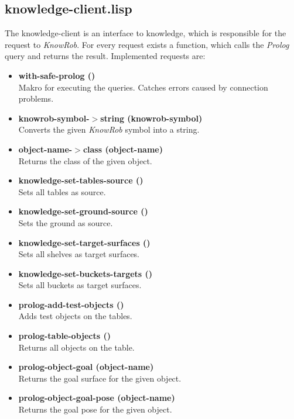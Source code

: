 \documentclass[main.tex]{subfiles}
\begin{document}
        \subsection{knowledge-client.lisp}
        The knowledge-client is an interface to knowledge, which is responsible for the request to \textit{KnowRob}. For every request exists a function, which calls the \textit{Prolog} query and returns the result. Implemented requests are:
            \begin{itemize}
            \label{knowledge-client}
              \item \textbf{with-safe-prolog ()} \\
              Makro for executing the queries. Catches errors caused by connection problems.
              \item \textbf{knowrob-symbol-$>$string (knowrob-symbol)} \\
              Converts the given \textit{KnowRob} symbol into a string.
              \item \textbf{object-name-$>$class (object-name)} \\
              Returns the class of the given object.
                \item \textbf{knowledge-set-tables-source ()} \\ Sets all tables as source.
                \item \textbf{knowledge-set-ground-source ()} \\ Sets the ground as source.
                \item \textbf{knowledge-set-target-surfaces ()} \\ Sets all shelves as target surfaces.
                \item \textbf{knowledge-set-buckets-targets ()} \\ Sets all buckets as target surfaces.
              \item \textbf{prolog-add-test-objects ()} \\ Adds test objects on the tables.
                \item \textbf{prolog-table-objects ()} \\ Returns all objects on the table.
                \item \textbf{prolog-object-goal (object-name)} \\ Returns the goal surface for the given object.
              \item \textbf{prolog-object-goal-pose (object-name)} \\ Returns the goal pose for the given object.

\end{itemize}
\end{document}
